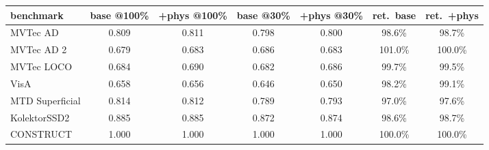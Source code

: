 \setlength{\tabcolsep}{3pt}
\begin{tabular}{@{}lcccccc@{}}
\toprule
benchmark & base @100\% & +phys @100\% & base @30\% & +phys @30\% & ret.\ base & ret.\ +phys \\
\midrule
MVTec AD & 0.809 & 0.811 & 0.798 & 0.800 & 98.6\% & 98.7\% \\
MVTec AD 2 & 0.679 & 0.683 & 0.686 & 0.683 & 101.0\% & 100.0\% \\
MVTec LOCO & 0.684 & 0.690 & 0.682 & 0.686 & 99.7\% & 99.5\% \\
VisA & 0.658 & 0.656 & 0.646 & 0.650 & 98.2\% & 99.1\% \\
MTD Superficial & 0.814 & 0.812 & 0.789 & 0.793 & 97.0\% & 97.6\% \\
KolektorSSD2 & 0.885 & 0.885 & 0.872 & 0.874 & 98.6\% & 98.7\% \\
CONSTRUCT & 1.000 & 1.000 & 1.000 & 1.000 & 100.0\% & 100.0\% \\
\bottomrule
\end{tabular}
